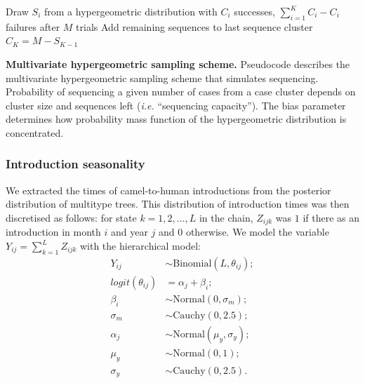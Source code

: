 \documentclass[11pt,oneside,letterpaper]{article}
\begin{document}
\begin{algorithm}[H]
 Draw $S_{i}$ from a hypergeometric distribution with $C_{i}$ successes, $\sum_{i=1}^{K} C_{i}-C_{i}$ failures after $M$ trials\;
 Add remaining sequences to last sequence cluster $C_{K} = M - S_{K-1}$\;
 \caption{\textbf{Multivariate hypergeometric sampling scheme.}
 Pseudocode describes the multivariate hypergeometric sampling scheme that simulates sequencing.
 Probability of sequencing a given number of cases from a case cluster depends on cluster size and sequences left (\textit{i.e.} ``sequencing capacity'').
 The bias parameter determines how probability mass function of the hypergeometric distribution is concentrated.
 }
 \label{hypergeometric}
\end{algorithm}

\subsubsection*{Introduction seasonality}

We extracted the times of camel-to-human introductions from the posterior distribution of multitype trees.
This distribution of introduction times was then discretised as follows: for state  $k = 1, 2, \ldots, L$ in the chain,  $Z_{ijk}$ was $1$ if there as an introduction in month $i$ and year $j$ and $0$ otherwise.
We model the variable $Y_{ij} = \sum_{k = 1}^L Z_{ijk}$ with the hierarchical model:
\begin{align*}
  Y_{ij} &\sim \text{Binomial}(L, \theta_{ij}); \\
  logit(\theta_{ij}) &= \alpha_j + \beta_i; \\
  \beta_i &\sim \text{Normal}(0, \sigma_{m}); \\
  \sigma_{m} &\sim \text{Cauchy}(0, 2.5); \\
  \alpha_j &\sim \text{Normal}(\mu_{y}, \sigma_{y}); \\
  \mu_{y}  &\sim  \text{Normal}(0, 1); \\
  \sigma_{y} &\sim \text{Cauchy}(0, 2.5).
\end{align*}
\end{document}
